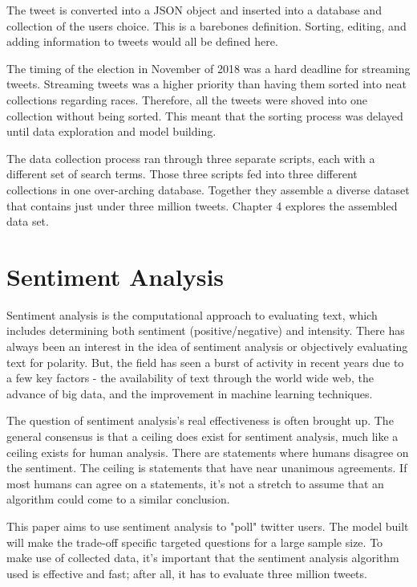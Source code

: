 \documentclass[11pt, twoside, reqno]{book}
\begin{document}
The tweet is converted into a JSON object and inserted into a database and collection of the users choice. This is a barebones definition. Sorting, editing, and adding information to tweets would all be defined here. 

The timing of the election in November of 2018 was a hard deadline for streaming tweets. Streaming tweets was a higher priority than having them sorted into neat collections regarding races. Therefore, all the tweets were shoved into one collection without being sorted. This meant that the sorting process was delayed until data exploration and model building. 

The data collection process ran through three separate scripts, each with a different set of search terms. Those three scripts fed into three different collections in one over-arching database. Together they assemble a diverse dataset that contains just under three million tweets. Chapter 4 explores the assembled data set.  


\chapter{Sentiment Analysis}
\label{ch:3}
\hspace{0.2in}Sentiment analysis is the computational approach to evaluating text, which includes determining both sentiment (positive/negative) and intensity. There has always been an interest in the idea of sentiment analysis or objectively evaluating text for polarity. But, the field has seen a burst of activity in recent years due to a few key factors - the availability of text through the world wide web, the advance of big data, and the improvement in machine learning techniques. 

The question of sentiment analysis's real effectiveness is often brought up. The general consensus is that a ceiling does exist for sentiment analysis, much like a ceiling exists for human analysis. There are statements where humans disagree on the sentiment. The ceiling is statements that have near unanimous agreements. If most humans can agree on a statements, it's not a stretch to assume that an algorithm could come to a similar conclusion. 

This paper aims to use sentiment analysis to "poll" twitter users. The model built will make the trade-off specific targeted questions for a large sample size. To make use of collected data, it's important that the sentiment analysis algorithm used is effective and fast; after all, it has to evaluate three million tweets. 
\end{document}
